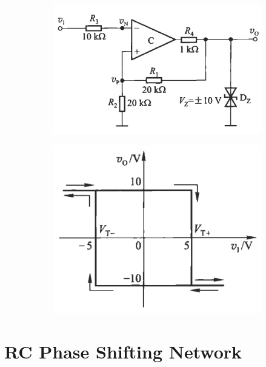 \begin{figure}[H]
  \centering
  \begin{subfigure}{.45\textwidth}
    \centering
    \includegraphics[width=\linewidth]{figures/Trigger-1}
  \end{subfigure}
  \quad\quad\quad\quad
  \begin{subfigure}{.35\textwidth}
    \centering
    \includegraphics[width=\linewidth]{figures/Trigger-2}
  \end{subfigure}
\end{figure}

\section{RC Phase Shifting Network}

